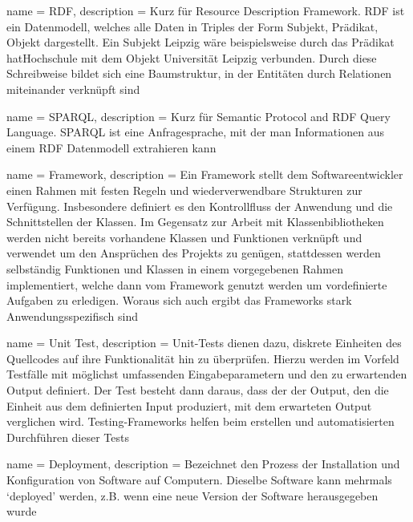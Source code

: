  {
    name = RDF,
    description = {
        Kurz für Resource Description Framework. RDF ist ein Datenmodell, 
        welches alle Daten in Triples der Form Subjekt,
        Prädikat, Objekt dargestellt. Ein Subjekt Leipzig wäre beispielsweise 
        durch das Prädikat hatHochschule mit dem Objekt Universität Leipzig 
        verbunden. Durch diese Schreibweise bildet sich eine Baumstruktur, in 
        der Entitäten durch Relationen miteinander verknüpft sind
    }
}

 {
    name = SPARQL,
    description = {
        Kurz für Semantic Protocol and RDF Query Language. SPARQL ist eine 
        Anfragesprache, mit der man Informationen aus einem RDF 
        Datenmodell extrahieren kann
    }
}

 {
    name = Framework,
    description = {
        Ein Framework stellt dem Softwareentwickler einen Rahmen mit festen 
        Regeln und wiederverwendbare Strukturen zur Verfügung. Insbesondere 
        definiert es den Kontrollfluss der Anwendung und die Schnittstellen der 
        Klassen. Im Gegensatz zur Arbeit mit Klassenbibliotheken werden nicht 
        bereits vorhandene Klassen und Funktionen verknüpft und verwendet um den 
        Ansprüchen des Projekts zu genügen, stattdessen werden selbständig 
        Funktionen und Klassen in einem vorgegebenen Rahmen implementiert, 
        welche dann vom Framework genutzt werden um vordefinierte Aufgaben zu 
        erledigen. Woraus sich auch ergibt das Frameworks stark 
        Anwendungsspezifisch sind
    }
}

 {
    name = Unit Test,
    description = {
        Unit-Tests dienen dazu, diskrete Einheiten des Quellcodes auf ihre 
        Funktionalität hin zu überprüfen. Hierzu werden im Vorfeld Testfälle mit 
        möglichst umfassenden Eingabeparametern und den zu erwartenden Output 
        definiert. Der Test besteht dann daraus, dass der der Output, den 
        die Einheit aus dem definierten Input produziert, mit dem erwarteten 
        Output verglichen wird. Testing-Frameworks helfen beim erstellen und 
        automatisierten Durchführen dieser Tests
    }
}

 {
    name = Deployment,
    description = {
        Bezeichnet den Prozess der Installation und Konfiguration von Software 
        auf Computern. Dieselbe Software kann mehrmals `deployed' werden, z.B. 
        wenn eine neue Version der Software herausgegeben wurde
    }
}

